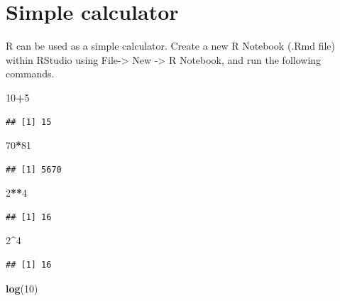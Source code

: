 \documentclass[]{book}
\newenvironment{Shaded}{\begin{snugshade}}{\end{snugshade}}
\newcommand{\KeywordTok}[1]{\textcolor[rgb]{0.13,0.29,0.53}{\textbf{#1}}}
\newcommand{\DecValTok}[1]{\textcolor[rgb]{0.00,0.00,0.81}{#1}}
\newcommand{\OperatorTok}[1]{\textcolor[rgb]{0.81,0.36,0.00}{\textbf{#1}}}
\newcommand{\NormalTok}[1]{#1}
\theoremstyle{definition}
\theoremstyle{definition}
\theoremstyle{definition}
\theoremstyle{remark}
\begin{document}
\section{Simple calculator}\label{simple-calculator}

R can be used as a simple calculator. Create a new R Notebook (.Rmd
file) within RStudio using File-\textgreater{} New -\textgreater{} R
Notebook, and run the following commands.

\begin{Shaded}
\begin{Highlighting}[]
\DecValTok{10}\OperatorTok{+}\DecValTok{5} 
\end{Highlighting}
\end{Shaded}

\begin{verbatim}
## [1] 15
\end{verbatim}

\begin{Shaded}
\begin{Highlighting}[]
\DecValTok{70}\OperatorTok{*}\DecValTok{81}
\end{Highlighting}
\end{Shaded}

\begin{verbatim}
## [1] 5670
\end{verbatim}

\begin{Shaded}
\begin{Highlighting}[]
\DecValTok{2}\OperatorTok{**}\DecValTok{4}
\end{Highlighting}
\end{Shaded}

\begin{verbatim}
## [1] 16
\end{verbatim}

\begin{Shaded}
\begin{Highlighting}[]
\DecValTok{2}\OperatorTok{^}\DecValTok{4}
\end{Highlighting}
\end{Shaded}

\begin{verbatim}
## [1] 16
\end{verbatim}

\begin{Shaded}
\begin{Highlighting}[]
\KeywordTok{log}\NormalTok{(}\DecValTok{10}\NormalTok{)                         }
\end{Highlighting}
\end{Shaded}
\end{document}
